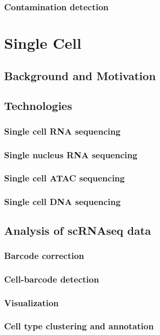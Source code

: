 \subsubsection{Contamination detection}

\section{Single Cell}
\subsection{Background and Motivation}
\subsection{Technologies}
\subsubsection{Single cell RNA sequencing}
\subsubsection{Single nucleus RNA sequencing}
\subsubsection{Single cell ATAC sequencing}
\subsubsection{Single cell DNA sequencing}

\subsection{Analysis of scRNAseq data}
\subsubsection{Barcode correction}
\subsubsection{Cell-barcode detection}
\subsubsection{Visualization}
\subsubsection{Cell type clustering and annotation}
